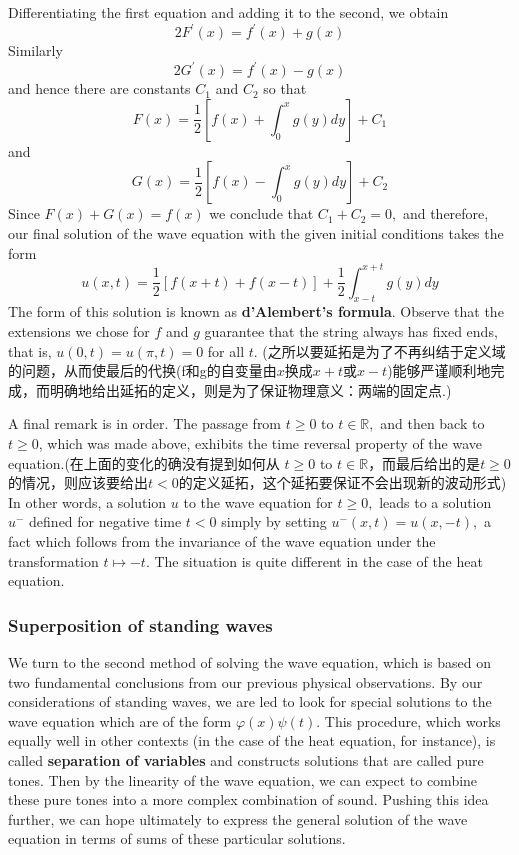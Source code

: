 \documentclass[12pt]{book}
\theoremstyle{definition}\newtheorem{dfn}{Définition}[chapter]
\theoremstyle{plain}\newtheorem{thm}{Théorème}[chapter]
\theoremstyle{plain}\newtheorem{prp}{Proposition}[chapter]
\theoremstyle{plain}\newtheorem{lem}{\bf Lemme}[chapter]
\theoremstyle{plain}\newtheorem{axm}{\bf Axiome}[chapter]
\theoremstyle{plain}\newtheorem{lmm}{\bf Lemme}[chapter]
\theoremstyle{plain}\newtheorem{exm}{\bf Example}[chapter]
\theoremstyle{plain}\newtheorem{cor}{\bf Corollaire}[chapter]
\theoremstyle{remark}\newtheorem{rem}{Remarque}[chapter]
\begin{document}
Differentiating the first equation and adding it to the second, we obtain
$$
2 F^{\prime}(x)=f^{\prime}(x)+g(x)
$$
Similarly
$$
2 G^{\prime}(x)=f^{\prime}(x)-g(x)
$$
and hence there are constants $C_{1}$ and $C_{2}$ so that
$$
F(x)=\frac{1}{2}\left[f(x)+\int_{0}^{x} g(y) d y\right]+C_{1}
$$
and
$$
G(x)=\frac{1}{2}\left[f(x)-\int_{0}^{x} g(y) d y\right]+C_{2}
$$
Since $F(x)+G(x)=f(x)$ we conclude that $C_{1}+C_{2}=0,$ and therefore, our final solution of the wave equation with the given initial conditions takes the form $$
u(x, t)=\frac{1}{2}[f(x+t)+f(x-t)]+\frac{1}{2} \int_{x-t}^{x+t} g(y) d y
$$
The form of this solution is known as {\bf d'Alembert's formula}. Observe that the extensions we chose for $f$ and $g$ guarantee that the string always has fixed ends, that is, $u(0, t)=u(\pi, t)=0$ for all $t$.
(之所以要延拓是为了不再纠结于定义域的问题，从而使最后的代换(f和g的自变量由$x$换成$x+t$或$x-t$)能够严谨顺利地完成，而明确地给出延拓的定义，则是为了保证物理意义：两端的固定点.)

A final remark is in order. The passage from $t \geq 0$ to $t \in \mathbb{R},$ and then back to $t \geq 0$, which was made above, exhibits the time reversal property of the wave equation.(在上面的变化的确没有提到如何从 $t \geq 0$ to $t \in \mathbb{R}$，而最后给出的是$t \geq 0$的情况，则应该要给出$t<0$的定义延拓，这个延拓要保证不会出现新的波动形式) In other words, a solution $u$ to the wave equation for $t \geq 0,$ leads to a solution $u^{-}$ defined for negative time $t<0$ simply by setting $u^{-}(x, t)=u(x,-t),$ a fact which follows from the invariance of the wave equation under the transformation $t \mapsto-t .$ The situation is quite different in the case of the heat equation.


\subsubsection{Superposition of standing waves}
We turn to the second method of solving the wave equation, which is based on two fundamental conclusions from our previous physical observations. By our considerations of standing waves, we are led to look for special solutions to the wave equation which are of the form $\varphi(x) \psi(t)$. This procedure, which works equally well in other contexts (in the case of the heat equation, for instance), is called {\bf separation of variables} and constructs solutions that are called pure tones. Then by the linearity of the wave equation, we can expect to combine these pure tones into a more complex combination of sound. Pushing this idea further, we can hope ultimately to express the general solution of the wave equation in terms of sums of these particular solutions.
\end{document}
